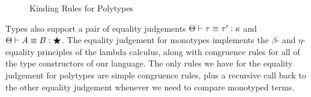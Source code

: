 \begin{figure}[h]
\caption{Kinding Rules for Polytypes}
\label{polytype-kinding}
\end{figure}


Types also support a pair of equality judgements
${\Theta} \vdash {\tau} \equiv {\tau'} : {\kappa}$ and ${\Theta} \vdash {A} \equiv {B} : {\bigstar}$.  The
equality judgement for monotypes implements the $\beta$- and
$\eta$-equality principles of the lambda calculus, along with
congruence rules for all of the type constructors of our language.
The only rules we have for the equality judgement for polytypes are
simple congruence rules, plus a recursive call back to the other
equality judgement whenever we need to compare monotyped terms.

